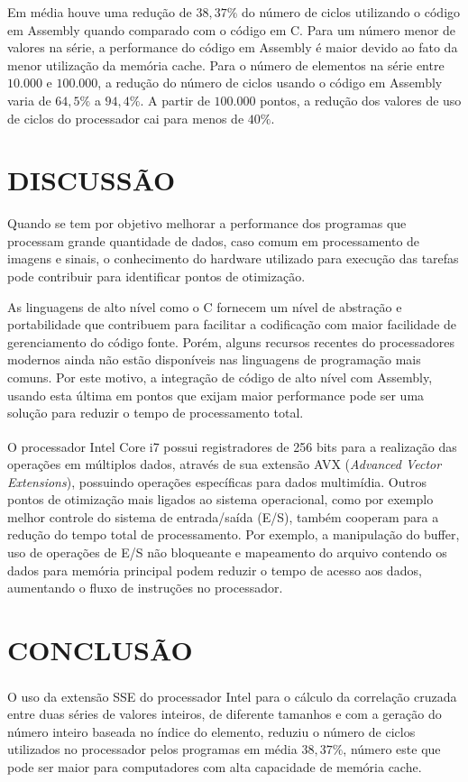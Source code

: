 \documentclass[a4paper]{article}
\def\TR{\textsuperscript{\textregistered}}
\def\TM{\textsuperscript{\texttrademark}}
\begin{document}
Em média houve uma redução de $38,37\%$ do número de ciclos utilizando
o código em Assembly quando comparado com o código em C. Para um
número menor de valores na série, a performance do código em Assembly
é maior devido ao fato da menor utilização da memória cache. Para o
número de elementos na série entre $10.000$ e $100.000$, a redução do
número de ciclos usando o código em Assembly varia de $64,5\%$ a
$94,4\%$. A partir de $100.000$ pontos, a redução dos valores de uso de ciclos
do processador cai para menos de $40\%$.

\section*{DISCUSSÃO}

Quando se tem por objetivo melhorar a performance dos programas que
processam grande quantidade de dados, caso comum em processamento de
imagens e sinais, o conhecimento do hardware utilizado para execução
das tarefas pode contribuir para identificar pontos de otimização.

As linguagens de alto nível como o C fornecem um nível de abstração e
portabilidade que contribuem para facilitar a codificação com maior
facilidade de gerenciamento do código fonte. Porém, alguns recursos
recentes do processadores modernos ainda não estão disponíveis nas
linguagens de programação mais comuns. Por este motivo, a integração
de código de alto nível com Assembly, usando esta última em pontos que
exijam maior performance pode ser uma solução para reduzir o tempo de
processamento total.

O processador Intel\TR{} Core\TM{} i7 possui registradores de 256 bits
para a realização das operações em múltiplos dados, através de sua
extensão AVX ({\em Advanced Vector Extensions}), possuindo operações
específicas para dados multimídia.  Outros pontos de otimização mais
ligados ao sistema operacional, como por exemplo melhor controle do
sistema de entrada/saída (E/S), também cooperam para a redução do
tempo total de processamento. Por exemplo, a manipulação do buffer,
uso de operações de E/S não bloqueante e mapeamento do arquivo
contendo os dados para memória principal podem reduzir o tempo de
acesso aos dados, aumentando o fluxo de instruções no processador.

\section*{CONCLUSÃO}

O uso da extensão SSE do processador Intel\TR{} para o cálculo da
correlação cruzada entre duas séries de valores inteiros, de diferente
tamanhos e com a geração do número inteiro baseada no índice do
elemento, reduziu o número de ciclos utilizados no processador pelos
programas em média $38,37\%$, número este que pode ser maior para
computadores com alta capacidade de memória cache.
\end{document}
